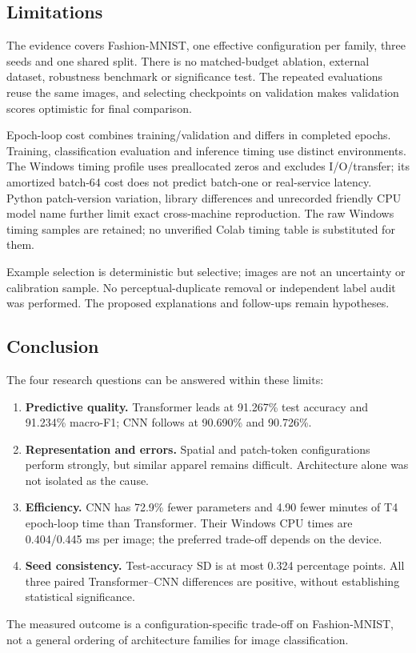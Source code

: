 \subsection{Limitations}
The evidence covers Fashion-MNIST, one effective configuration per family,
three seeds and one shared split. There is no matched-budget ablation, external
dataset, robustness benchmark or significance test. The repeated evaluations
reuse the same images, and selecting checkpoints on validation makes validation
scores optimistic for final comparison.

Epoch-loop cost combines training/validation and differs in completed epochs.
Training, classification evaluation and inference timing use distinct environments.
The Windows timing profile uses preallocated zeros and excludes I/O/transfer;
its amortized batch-64 cost does not predict batch-one or real-service latency.
Python patch-version variation, library differences and unrecorded friendly CPU
model name further limit exact cross-machine reproduction. The raw Windows timing
samples are retained; no unverified Colab timing table is substituted for them.

Example selection is deterministic but selective; images are not an uncertainty
or calibration sample. No perceptual-duplicate removal or independent label audit
was performed. The proposed explanations and follow-ups remain hypotheses.

\subsection{Conclusion}
The four research questions can be answered within these limits:
\begin{enumerate}
\item \textbf{Predictive quality.} Transformer leads at 91.267\% test accuracy
and 91.234\% macro-F1; CNN follows at 90.690\% and 90.726\%.
\item \textbf{Representation and errors.} Spatial and patch-token configurations
perform strongly, but similar apparel remains difficult. Architecture alone
was not isolated as the cause.
\item \textbf{Efficiency.} CNN has 72.9\% fewer parameters and 4.90 fewer
minutes of T4 epoch-loop time than Transformer. Their Windows CPU times are
0.404/0.445 ms per image; the preferred trade-off depends on the device.
\item \textbf{Seed consistency.} Test-accuracy SD is at most 0.324 percentage
points. All three paired Transformer--CNN differences are positive, without
establishing statistical significance.
\end{enumerate}
The measured outcome is a configuration-specific trade-off on Fashion-MNIST,
not a general ordering of architecture families for image classification.
\FloatBarrier
